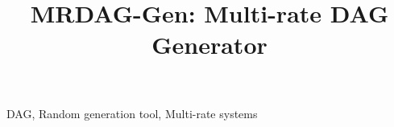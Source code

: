 \documentclass[conference]{IEEEtran}
\newcommand{\todo}[1]{\hl{\textbf{TODO:} #1}}
\begin{document}
\title{MRDAG-Gen: Multi-rate DAG Generator}
\maketitle

\author{
}



\begin{IEEEkeywords}
    DAG, Random generation tool, Multi-rate systems
\end{IEEEkeywords}

















\end{document}
